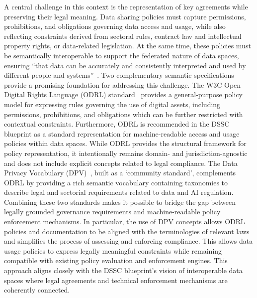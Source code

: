 A central challenge in this context
is the representation of key agreements
while preserving their legal meaning.
Data sharing policies must capture
permissions, prohibitions, and obligations
governing data access and usage,
while also reflecting constraints
derived from sectoral rules, 
contract law and intellectual property rights,
or data-related legislation.
At the same time,
these policies must be semantically interoperable
to support the federated nature of data spaces,
ensuring ``that data can be accurately and
consistently interpreted and used by
different people and systems''~\cite{steinbuss_semantic_2025}.
Two complementary semantic specifications provide
a promising foundation for addressing this challenge.
The W3C Open Digital Rights Language (ODRL) standard~\cite{iannella_odrl_2018}
provides a general-purpose policy model
for expressing rules
governing the use of digital assets,
including permissions, prohibitions, and obligations
which can be further restricted with contextual constraints.
Furthermore,
ODRL is recommended in the DSSC blueprint
as a standard representation for machine-readable
access and usage policies within data spaces.
While ODRL provides the structural framework for policy representation,
it intentionally remains domain- and jurisdiction-agnostic and
does not include explicit concepts related to legal compliance.
The Data Privacy Vocabulary (DPV)~\cite{pandit_data_2024},
built as a `community standard',
complements ODRL by providing a rich semantic vocabulary
containing taxonomies to describe legal and sectorial requirements
related to data and AI regulation.
Combining these two standards
makes it possible to bridge the gap between
legally grounded governance requirements and
machine-readable policy enforcement mechanisms.
In particular, the use of DPV concepts allows ODRL policies
and documentation to be aligned with the terminologies 
of relevant laws and simplifies the process
of assessing and enforcing compliance.
This allows data usage policies to express legally meaningful constraints
while remaining compatible with existing policy evaluation and enforcement engines.
This approach aligns closely with
the DSSC blueprint's vision of interoperable data spaces
where legal agreements and
technical enforcement mechanisms
are coherently connected.

